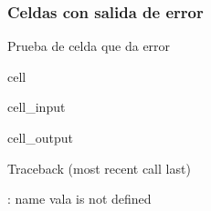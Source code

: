 \documentclass[letterpaper,10pt,english]{jupyterBook}
\begin{document}
\subsubsection{Celdas con salida de error}
\label{\detokenize{docs/01_01_Code_Blocks:celdas-con-salida-de-error}}
\sphinxAtStartPar
Prueba de celda que da error

\begin{sphinxuseclass}{cell}\begin{sphinxVerbatimInput}

\begin{sphinxuseclass}{cell_input}
\begin{sphinxVerbatim}[commandchars=\\\{\}]
\end{sphinxVerbatim}

\end{sphinxuseclass}\end{sphinxVerbatimInput}
\begin{sphinxVerbatimOutput}

\begin{sphinxuseclass}{cell_output}
\begin{sphinxVerbatim}[commandchars=\\\{\}]
Traceback (most recent call last)
 \PYG{p}{[}\PYG{p}{]}  
 

: name \PYGZsq{}val\PYGZus{}a\PYGZsq{} is not defined
\end{sphinxVerbatim}

\end{sphinxuseclass}\end{sphinxVerbatimOutput}

\end{sphinxuseclass}
\end{document}
